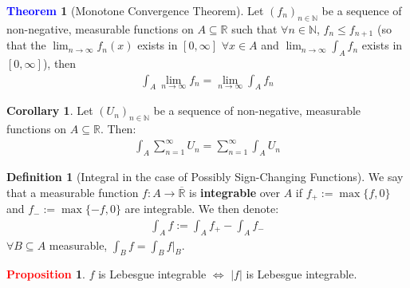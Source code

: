 \documentclass[11pt]{article}
\theoremstyle{definition}
\newcommand{\bb}[1]{\mathbb{#1}}
\newtheorem{theorem}{\textcolor{blue}{Theorem}}
\newtheorem{corollary}{Corollary}
\theoremstyle{definition}
\newtheorem{definition}{\textcolor{OliveGreen}{Definition}}
\newtheorem{prop}{\textcolor{red}{Proposition}}
\theoremstyle{remark}
\begin{document}
\begin{theorem}[Monotone Convergence Theorem]
	Let $(f_n)_{n \in \bb{N}}$ be a sequence of non-negative, measurable functions on $A \subseteq \bb{R}$ such that $\forall n \in \bb{N}$, $f_n \leq f_{n+1}$ (so that the $\lim_{n \rightarrow \infty} f_n(x) $ exists in $[0, \infty]$ $\forall x \in A$ and $\lim_{n \rightarrow \infty} \int_A f_n $ exists in $[0, \infty]$), then 
	\begin{align}
		\int_A \lim_{n \rightarrow \infty} f_n = \lim_{n \rightarrow \infty} \int_A f_n
	\end{align}
\end{theorem}

\begin{corollary} Let $(U_n)_{n \in \bb{N}}$ be a sequence of non-negative, measurable functions on $A \subseteq \bb{R}$. Then: 
\begin{align}
	\int_A \sum_{n=1}^\infty U_n = \sum_{n=1}^\infty \int_A U_n
\end{align}
\end{corollary}

\begin{definition}[Integral in the case of Possibly Sign-Changing Functions]
	We say that a measurable function $f: A \rightarrow \overline{\bb{R}}$ is \textbf{integrable} over $A$ if $f_+ := \max\{ f, 0 \}$ and $f_- := \max\{ -f, 0 \}$ are integrable. We then denote: 
	\begin{align}
		\int_A f := \int_A f_+ - \int_A f_-
	\end{align}
	$\forall B \subseteq A$ measurable, $\int_B f = \int_B f|_B$. 
\end{definition}

\begin{prop}
	$f$ is Lebesgue integrable $\iff$ $|f|$ is Lebesgue integrable. 
\end{prop}
\end{document}
